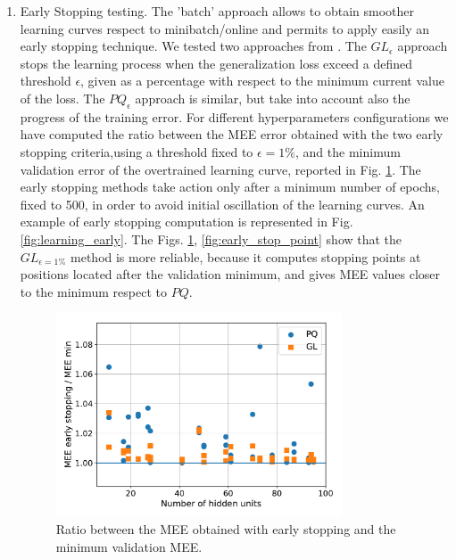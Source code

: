 \documentclass[11pt,twoside]{article}
\begin{document}
\begin{enumerate}
\item Early Stopping testing.
  The 'batch' approach allows to obtain smoother learning curves respect to minibatch/online and permits to apply easily an early stopping technique. We tested two approaches from \cite{early_stopping}.
  The $GL_{\epsilon}$ approach stops the learning process when the generalization loss exceed a defined threshold $\epsilon$, given as a percentage with respect to the minimum current value of the loss. The $PQ_{\epsilon}$ approach is similar, but take into account also the progress of the training error.
  For different hyperparameters configurations we have computed the ratio between the MEE error obtained with the two early stopping criteria,using a threshold fixed to $\epsilon=1\%$, and the minimum validation error of the overtrained learning curve, reported in Fig. \ref{fig:early_stop}. The early stopping methods take action only after a minimum number of epochs, fixed to 500, in order to avoid initial oscillation of the learning curves. An example of early stopping computation is represented in Fig. \ref{fig:learning_early}. The Figs. \ref{fig:early_stop}, \ref{fig:early_stop_point} show that the $GL_{\epsilon=1\%}$ method is more reliable, because it computes stopping points at positions located after the validation minimum, and gives MEE values closer to the minimum respect to $PQ$.

  \begin{figure}[htbp]
    \centering
    \includegraphics[width=0.80\textwidth]{img/early_stop.pdf}
    \caption{Ratio between the MEE obtained with early stopping and the minimum validation MEE.}
    \label{fig:early_stop}
  \end{figure}


\end{enumerate}
\end{document}
